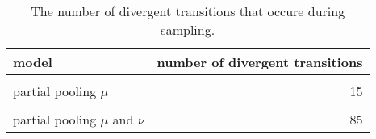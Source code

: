 \begin{table}
\centering
\caption{\label{tab:n_divergent}The number of divergent transitions that occure during sampling.}
\centering
\begin{tabular}[t]{lr}
\toprule
model & number of divergent transitions\\
\midrule
\cellcolor{gray!10}{complete pooling} & \cellcolor{gray!10}{0}\\
partial pooling $\mu$ & 15\\
\cellcolor{gray!10}{partial pooling $\nu$} & \cellcolor{gray!10}{28}\\
partial pooling $\mu$ and $\nu$ & 85\\
\bottomrule
\end{tabular}
\end{table}
